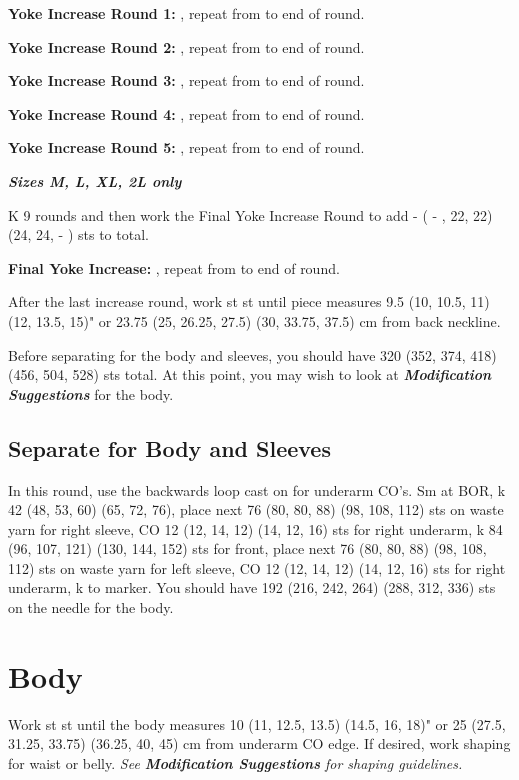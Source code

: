 \documentclass[12pt]{article}
\newcommand{\vocab}[1]{\emph{\textbf{#1}}} %
\newcommand{\rowDir}[1]{\textbf{#1:}} %
\renewcommand{\repeat}[1]{\textbf{\textasteriskcentered[#1]}, repeat from \textasteriskcentered \hspace{1pt}} %
\newenvironment{frnote}
    {%
    	\setlength{\FrameRule}{1.5pt}
    	\def\FrameCommand{\fboxrule=\FrameRule\fboxsep=\FrameSep \fcolorbox{framecolor}{shadecolor}}
    	\MakeFramed {\FrameRestore}}
    {\setlength{\FrameRule}{1pt}
	\endMakeFramed}
\begin{document}
\begin{multicols}{2}
\rowDir{Yoke Increase Round 1} \repeat{k1, m1, k10, m1, k1} to end of round. 

\rowDir{Yoke Increase Round 2} \repeat{k1, m1, k12, m1, k1} to end of round.

\rowDir{Yoke Increase Round 3} \repeat{k1, m1, k14, m1, k1} to end of round.

\rowDir{Yoke Increase Round 4} \repeat{k1, m1, k16, m1, k1} to end of round.

\rowDir{Yoke Increase Round 5} \repeat{k1, m1, k18, m1, k1} to end of round.

\begin{frnote}
\vocab{Sizes M, L, XL, 2L only}

K 9 rounds and then work the Final Yoke Increase Round to add - ( - , 22, 22) (24, 24, - ) sts to total.

\rowDir{Final Yoke Increase} \repeat{K - ( -, 16, 18) (18, 20, - ) sts, m1} to end of round.
\end{frnote}

After the last increase round, work st st until piece measures 
9.5 (10, 10.5, 11) (12, 13.5, 15)" or 23.75 (25, 26.25, 27.5) (30, 33.75, 37.5) cm from back neckline.

Before separating for the body and sleeves, you should have 
320 (352, 374, 418) (456, 504, 528) sts total. At this point, you may wish to look at \vocab{Modification Suggestions} for the body.

\subsection*{Separate for Body and Sleeves}

In this round, use the backwards loop cast on for underarm CO's. Sm at BOR, k 
42 (48, 53, 60) (65, 72, 76), place next 
76 (80, 80, 88) (98, 108, 112) sts on waste yarn for right sleeve, CO 
12 (12, 14, 12) (14, 12, 16) sts for right underarm, k 
84 (96, 107, 121) (130, 144, 152) sts for front, place next 
76 (80, 80, 88) (98, 108, 112) sts on waste yarn for left sleeve, CO 
12 (12, 14, 12) (14, 12, 16) sts for right underarm, k to marker. You should have 
192 (216, 242, 264) (288, 312, 336) sts on the needle for the body.

\section*{Body}

Work st st until the body measures 
10 (11, 12.5, 13.5) (14.5, 16, 18)" or 
25 (27.5, 31.25, 33.75) (36.25, 40, 45) cm from underarm CO edge.  If desired, work shaping for waist or belly. \emph{See \textbf{Modification Suggestions} for shaping guidelines.} 


\end{multicols}
\end{document}
